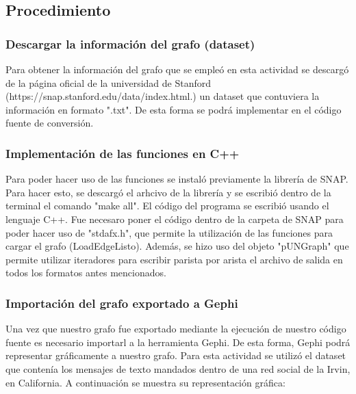 \documentclass[conference]{IEEEtran}
\begin{document}
\subsection{Procedimiento}
\subsubsection{Descargar la información del grafo (dataset)}
Para obtener la información del grafo que se empleó en esta actividad se descargó de  la página oficial de la universidad de Stanford (https://snap.stanford.edu/data/index.html.) un dataset que contuviera la información en  formato ".txt". De esta forma se podrá implementar en el código fuente de conversión.

\subsubsection{Implementación de las funciones en C++}
Para poder hacer uso de las funciones se instaló previamente la librería de SNAP. Para hacer esto, se descargó el arhcivo de la librería y se escribió dentro de la terminal el comando "make all". El código del programa se escribió usando el lenguaje C++. Fue necesaro poner el código dentro de la carpeta de SNAP para poder hacer uso de "stdafx.h", que permite la utilización de las funciones para cargar el grafo (LoadEdgeListo). Además, se hizo uso del objeto "pUNGraph" que permite utilizar iteradores para escribir parista por arista el archivo de salida en todos los formatos antes mencionados.

\subsubsection{Importación del grafo exportado a Gephi}
Una vez que nuestro grafo fue exportado mediante la ejecución de nuestro código fuente es necesario importarl a la herramienta Gephi. De esta forma, Gephi podrá representar gráficamente a nuestro grafo. Para esta actividad se utilizó el dataset que contenía los mensajes de texto mandados dentro de una red social de la  Irvin, en California. A continuación se muestra su representación gráfica:
\ 
\\  
\end{document}
